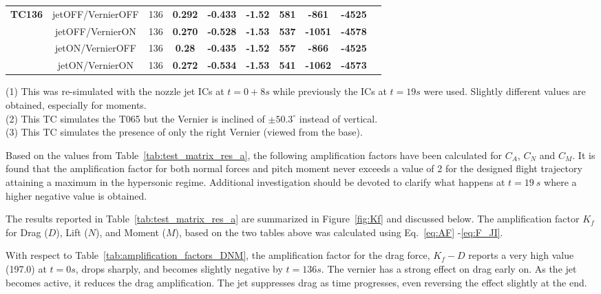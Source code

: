 \documentclass[12pt]{article}
\begin{document}
\begin{table}[H]
{\begin{tabular}{|c|c|c|c|c|c|c|c|c|c|}
%                        
\multirow{4}{*}{\textbf{TC136}} & jetOFF/VernierOFF & 136 & \textbf{0.292} & \textbf{-0.433} & \textbf{-1.52 }& \textbf{581} & \textbf{-861} & \textbf{-4525} \\ \cline{2-9}
                       & jetOFF/VernierON  & 136 & \textbf{0.270} & \textbf{-0.528} & \textbf{-1.53} & \textbf{537} & \textbf{-1051} & \textbf{-4578} \\ \cline{2-9}
                       & jetON/VernierOFF  & 136 & \textbf{0.28}  & \textbf{-0.435} & \textbf{-1.52} & \textbf{557} & \textbf{-866}  & \textbf{-4525} \\ \cline{2-9}
                       & jetON/VernierON   & 136 & \textbf{0.272} & \textbf{-0.534} & \textbf{-1.53} & \textbf{541} & \textbf{-1062} & \textbf{-4573} \\ \hline \hline
%
\end{tabular}}
(1) This was re-simulated with the nozzle jet ICs at $t=0+8s$ while previously the ICs at $t=19s$ were used. Slightly different values are obtained, especially for moments. \\
(2) This TC simulates the T065 but the Vernier is inclined of $\pm 50.3^\circ$ instead of vertical.\\
(3) This TC simulates the presence of only the right Vernier (viewed from the base).
\end{table}

Based on the values from Table~\ref{tab:test_matrix_res_a}, the following amplification factors have been calculated for $C_A$, $C_N$ and $C_M$. It is found that the amplification factor for both normal forces and pitch moment never exceeds a value of 2 for the designed  flight trajectory attaining a maximum in the hypersonic regime. Additional investigation should be devoted to clarify what happens at $t=19~s$ where a higher negative value is obtained.

The results reported in Table~\ref{tab:test_matrix_res_a} are summarized in Figure~\ref{fig:Kf} and discussed below. The amplification factor $K_f$ for Drag ($D$), Lift ($N$), and Moment ($M$), based on the two tables above was calculated using Eq.~\ref{eq:AF} -\ref{eq:F_JI}.

With respect to Table~\ref{tab:amplification_factors_DNM}, the amplification factor for the drag force, $K_f-D$ reports a very high value (197.0) at $t=0s$, drops sharply, and becomes slightly negative by $t=136s$. The vernier has a strong effect on drag early on. As the jet becomes active, it reduces the drag amplification. The jet suppresses drag as time progresses, even reversing the effect slightly at the end.
\end{document}
